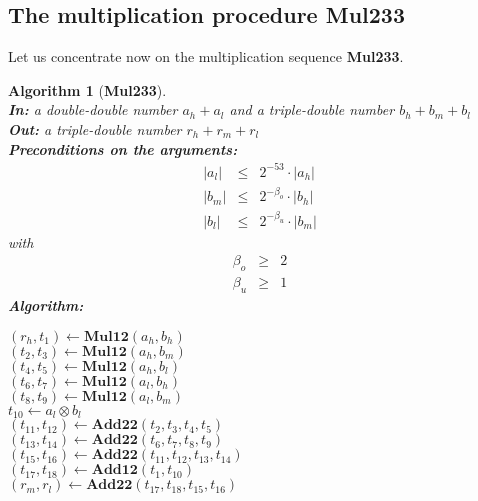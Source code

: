 \documentclass[a4paper,10pt,twoside]{article}
\newtheorem{algorithm}[theorem]{Algorithm}
\newcommand{\hi}{\ensuremath{\mathit{h}}}
\newcommand{\mi}{\ensuremath{\mathit{m}}}
\newcommand{\lo}{\ensuremath{\mathit{l}}}
\newcommand{\MulDTT}{{\bf Mul233}}
\newcommand{\mAdd}{\ensuremath{\mathbf{Add12}}}
\newcommand{\mAddDD}{\ensuremath{\mathbf{Add22}}}
\newcommand{\mMul}{\ensuremath{\mathbf{Mul12}}}
\begin{document}
\subsection{The multiplication procedure \MulDTT}
Let us concentrate now on the multiplication sequence \MulDTT.
\begin{algorithm}[\MulDTT] \label{mulDTTref} ~ \\
{\bf In:} a double-double number $a_\hi + a_\lo$  and a triple-double number $b_\hi + b_\mi + b_\lo$ \\
{\bf Out:} a triple-double number $r_\hi + r_\mi + r_\lo$ \\
{\bf Preconditions on the arguments:}
\begin{eqnarray*}
\left \vert a_\lo \right \vert & \leq & 2^{-53} \cdot \left \vert a_\hi \right \vert \\
\left \vert b_\mi \right \vert & \leq & 2^{-\beta_o} \cdot \left \vert b_\hi \right \vert \\
\left \vert b_\lo \right \vert & \leq & 2^{-\beta_u} \cdot \left \vert b_\mi \right \vert
\end{eqnarray*}
with
\begin{eqnarray*}
\beta_o & \geq & 2 \\
\beta_u & \geq & 1
\end{eqnarray*}
{\bf Algorithm:} \\
\begin{center}
\begin{minipage}[b]{60mm}
$\left( r_\hi, t_1 \right) \gets \mMul\left( a_\hi, b_\hi \right)$ \\
$\left( t_2, t_3 \right) \gets \mMul\left( a_\hi, b_\mi \right)$ \\
$\left( t_4, t_5 \right) \gets \mMul\left( a_\hi, b_\lo \right)$ \\
$\left( t_6, t_7 \right) \gets \mMul\left( a_\lo, b_\hi \right)$ \\
$\left( t_8, t_9 \right) \gets \mMul\left( a_\lo, b_\mi \right)$ \\
$t_{10} \gets a_\lo \otimes b_\lo$ \\
$\left( t_{11}, t_{12} \right) \gets \mAddDD\left( t_2, t_3, t_4, t_5 \right)$ \\
$\left( t_{13}, t_{14} \right) \gets \mAddDD\left( t_6, t_7, t_8, t_9 \right)$ \\
$\left( t_{15}, t_{16} \right) \gets \mAddDD\left( t_{11}, t_{12}, t_{13}, t_{14} \right)$ \\
$\left( t_{17}, t_{18} \right) \gets \mAdd\left( t_1, t_{10} \right)$ \\
$\left( r_\mi, r_\lo \right) \gets \mAddDD\left( t_{17}, t_{18}, t_{15}, t_{16} \right)$ \\
\end{minipage}
\end{center}
\end{algorithm}
\end{document}
